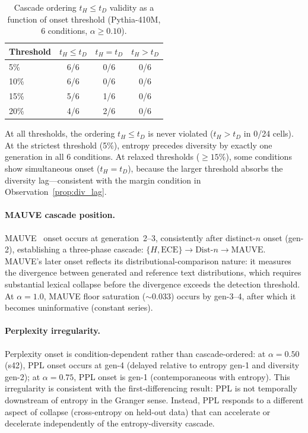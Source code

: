 \begin{table}[H]
\centering
\small
\caption{Cascade ordering $t_H \leq t_D$ validity as a function of onset threshold (Pythia-410M, 6 conditions, $\alpha{\geq}0.10$).}
\label{tab:onset_threshold_sensitivity}
\begin{tabular}{lccc}
\toprule
Threshold & $t_H \leq t_D$ & $t_H = t_D$ & $t_H > t_D$ \\
\midrule
5\% & 6/6 & 0/6 & 0/6 \\
10\% & 6/6 & 0/6 & 0/6 \\
15\% & 5/6 & 1/6 & 0/6 \\
20\% & 4/6 & 2/6 & 0/6 \\
\bottomrule
\end{tabular}
\end{table}

At all thresholds, the ordering $t_H \leq t_D$ is never violated ($t_H > t_D$ in 0/24 cells).
At the strictest threshold (5\%), entropy precedes diversity by exactly one generation in all 6 conditions.
At relaxed thresholds (${\geq}15\%$), some conditions show simultaneous onset ($t_H = t_D$), because the larger threshold absorbs the diversity lag---consistent with the margin condition in Observation~\ref{prop:div_lag}.

\paragraph{MAUVE cascade position.}
MAUVE~\citep{pillutla2021mauve} onset occurs at generation~2--3, consistently after distinct-$n$ onset (gen-2), establishing a three-phase cascade: $\{H, \mathrm{ECE}\} \to \mathrm{Dist}\text{-}n \to \mathrm{MAUVE}$.
MAUVE's later onset reflects its distributional-comparison nature: it measures the divergence between generated and reference text distributions, which requires substantial lexical collapse before the divergence exceeds the detection threshold.
At $\alpha{=}1.0$, MAUVE floor saturation (${\sim}0.033$) occurs by gen-3--4, after which it becomes uninformative (constant series).

\paragraph{Perplexity irregularity.}
Perplexity onset is condition-dependent rather than cascade-ordered: at $\alpha{=}0.50$ (s42), PPL onset occurs at gen-4 (delayed relative to entropy gen-1 and diversity gen-2); at $\alpha{=}0.75$, PPL onset is gen-1 (contemporaneous with entropy).
This irregularity is consistent with the first-differencing result: PPL is not temporally downstream of entropy in the Granger sense.
Instead, PPL responds to a different aspect of collapse (cross-entropy on held-out data) that can accelerate or decelerate independently of the entropy-diversity cascade.


